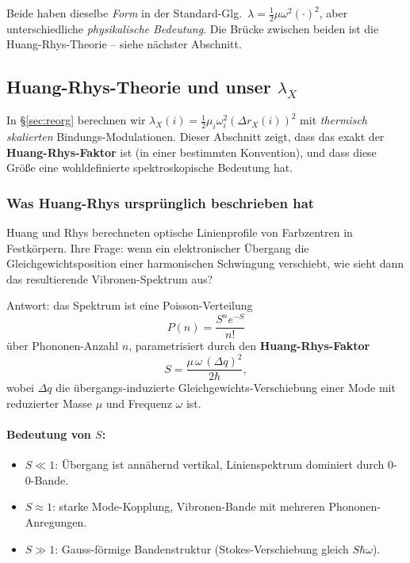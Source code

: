 \documentclass[11pt,a4paper,twoside]{article}
\theoremstyle{remark}
\begin{document}
Beide haben dieselbe \emph{Form} in der Standard-Glg.\
$\lambda = \tfrac{1}{2}\mu\omega^2(\cdot)^2$, aber unterschiedliche
\emph{physikalische Bedeutung}. Die Br\"ucke zwischen beiden ist die
Huang-Rhys-Theorie -- siehe n\"achster Abschnitt.

\subsection{Huang-Rhys-Theorie und unser $\lambda_X$}
\label{sec:huang-rhys}

In \S\ref{sec:reorg} berechnen wir
$\lambda_X(i) = \tfrac{1}{2}\mu_i\omega_i^2(\Delta r_X(i))^2$ mit
\emph{thermisch skalierten} Bindungs-Modulationen. Dieser Abschnitt
zeigt, dass das exakt der \textbf{Huang-Rhys-Faktor} ist (in einer
bestimmten Konvention), und dass diese Gr\"o{\ss}e eine wohldefinierte
spektroskopische Bedeutung hat.

\subsubsection*{Was Huang-Rhys urspr\"unglich beschrieben hat}

Huang und Rhys \cite{HuangRhys1950} berechneten optische Linienprofile
von Farbzentren in Festk\"orpern. Ihre Frage: wenn ein elektronischer
\"Ubergang die Gleichgewichtsposition einer harmonischen Schwingung
verschiebt, wie sieht dann das resultierende Vibronen-Spektrum aus?

Antwort: das Spektrum ist eine Poisson-Verteilung
\begin{equation}
  P(n) = \frac{S^n e^{-S}}{n!}
\end{equation}
\"uber Phononen-Anzahl $n$, parametrisiert durch den
\textbf{Huang-Rhys-Faktor}
\begin{equation}
  S = \frac{\mu\,\omega\,(\Delta q)^2}{2\hbar},
  \label{eq:huang-rhys}
\end{equation}
wobei $\Delta q$ die \"ubergangs-induzierte Gleichgewichts-Verschiebung
einer Mode mit reduzierter Masse $\mu$ und Frequenz $\omega$ ist.

\paragraph{Bedeutung von $S$:}
\begin{itemize}\setlength{\itemsep}{0pt}
  \item $S \ll 1$: \"Ubergang ist ann\"ahernd vertikal,
        Linienspektrum dominiert durch 0-0-Bande.
  \item $S \approx 1$: starke Mode-Kopplung, Vibronen-Bande mit
        mehreren Phononen-Anregungen.
  \item $S \gg 1$: Gauss-f\"ormige Bandenstruktur (Stokes-Verschiebung
        gleich $S\hbar\omega$).
\end{itemize}
\end{document}
